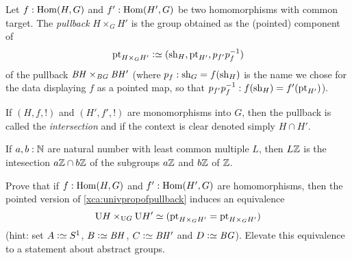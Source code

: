 \begin{definition}
  \label{def:intersectionofgroups}
  Let $f:\Hom(H,G)$ and $f':\Hom(H',G)$ be two homomorphisms with common target.  The \emph{pullback} $H\times_GH'$ is the group obtained as the (pointed) component of
$$\pt_{H\times_GH'}\defequi(\shape_H,\pt_{H'},p_{f'}p_f^{-1})$$ of the pullback $\mathit{B}\mathit{H}\times_{\mathit{B}\mathit{G}}\mathit{B}\mathit{H}'$ (where $p_f:\mathrm{sh}_G=f(\mathrm{sh}_H)$ is the name we chose for the data displaying $f$ as a pointed map, so that $p_{f'}p_f^{-1}:f(\mathrm{sh}_H)=f'(\mathrm{pt}_{H'})$).

If $(H,f,!)$ and $(H',f',!)$ are monomorphisms into $G$, then the pullback is called the \emph{intersection} and if the context is clear denoted simply $H\cap H'$.
\end{definition}
\begin{example}
  If $a,b:\mathbb{N}$ are natural number with least common multiple $L$, then $L\mathbb{Z}$ is the intesection $a\mathbb{Z}\cap b\mathbb{Z}$ of the subgroups $a\mathbb{Z}$ and $b\mathbb{Z}$ of $\mathbb{Z}$.
\end{example}

\begin{xca}
  Prove that if $f:\Hom(H,G)$ and $f':\Hom(H',G)$ are homomorphisms, then the pointed version of \cref{xca:univpropofpullback} induces an equivalence
$$\mathrm{U} H\times_{\mathrm{U} G}\mathrm{U} {H'}
\simeq (\mathrm{pt}_{H\times_GH'}=\mathrm{pt}_{H\times_GH'})
$$
(hint: set $A\defequi S^1$, $B\defequi \BH$, $C\defequi \BH'$ and $D\defequi \BG$).  Elevate this equivalence to a statement about abstract groups.
\end{xca}

